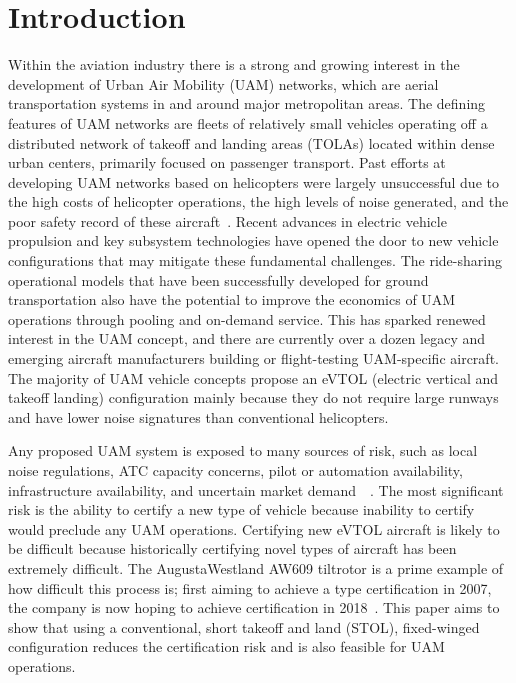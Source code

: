 \documentclass[]{aiaa-tc}%
\begin{document}
\section{Introduction}
Within the aviation industry there is a strong and growing interest in the development of Urban Air Mobility (UAM) networks,  which are aerial transportation systems in and around major metropolitan areas.  The defining features of UAM networks are fleets of relatively small vehicles operating off a distributed network of takeoff and landing areas (TOLAs) located within dense urban centers, primarily focused on passenger transport. Past efforts at developing UAM networks based on helicopters were largely unsuccessful due to the high costs of helicopter operations, the high levels of noise generated, and the poor safety record of these aircraft~\cite{Vascik2017}.  Recent advances in electric vehicle propulsion and key subsystem technologies have opened the door to new vehicle configurations that may mitigate these fundamental challenges.  The ride-sharing operational models that have been successfully developed for ground transportation also have the potential to improve the economics of UAM  operations through pooling and on-demand service. This has sparked renewed interest in the UAM concept, and there are currently over a dozen legacy and emerging aircraft manufacturers building or flight-testing UAM-specific aircraft. The majority of UAM vehicle concepts propose an eVTOL (electric vertical and takeoff landing) configuration mainly because they do not require large runways and have lower noise signatures than conventional helicopters.  

Any proposed UAM system is exposed to many sources of risk, such as local noise regulations, ATC capacity concerns, pilot or automation availability, infrastructure availability, and uncertain market demand~\cite{Vascik2017}~\cite{Uber}.  The most significant risk is the ability to certify a new type of vehicle because inability to certify would preclude any UAM operations.  Certifying new eVTOL aircraft is likely to be difficult because historically certifying novel types of aircraft has been extremely difficult. The AugustaWestland AW609 tiltrotor is a prime example of how difficult this process is;  first aiming to achieve a type certification  in 2007, the company is now hoping to achieve certification in 2018~\cite{AW609}.  This paper aims to show that using a conventional, short takeoff and land (STOL), fixed-winged configuration reduces the certification risk and is also feasible for UAM operations.   
\end{document}
